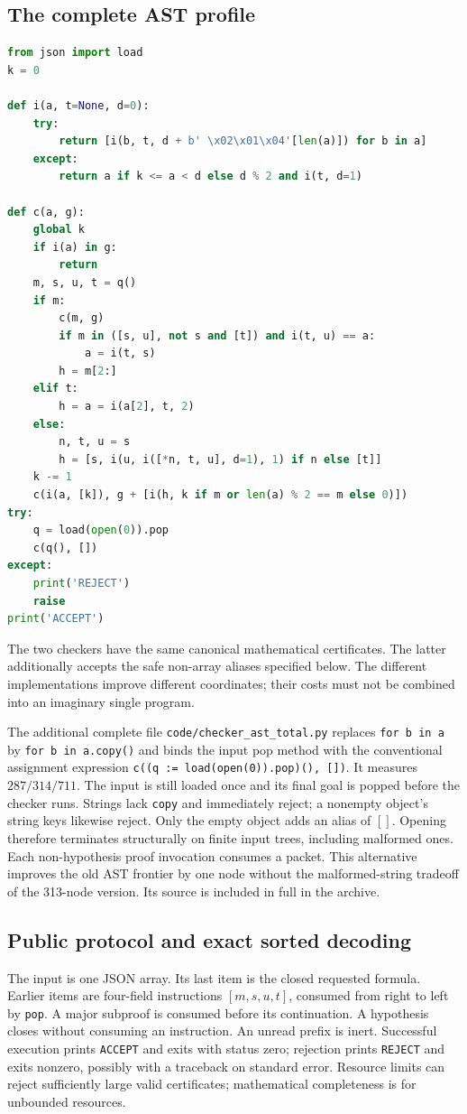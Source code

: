 \documentclass[11pt,letterpaper]{article}
\theoremstyle{definition}\newtheorem{definition}[theorem]{Definition}
\theoremstyle{remark}\newtheorem{remark}[theorem]{Remark}
\newcommand{\file}[1]{{\small\nolinkurl{#1}}}
\begin{document}
\subsection{The complete AST profile}
\begin{lstlisting}[language=Python]
from json import load
k = 0

def i(a, t=None, d=0):
    try:
        return [i(b, t, d + b' \x02\x01\x04'[len(a)]) for b in a]
    except:
        return a if k <= a < d else d % 2 and i(t, d=1)

def c(a, g):
    global k
    if i(a) in g:
        return
    m, s, u, t = q()
    if m:
        c(m, g)
        if m in ([s, u], not s and [t]) and i(t, u) == a:
            a = i(t, s)
        h = m[2:]
    elif t:
        h = a = i(a[2], t, 2)
    else:
        n, t, u = s
        h = [s, i(u, i([*n, t, u], d=1), 1) if n else [t]]
    k -= 1
    c(i(a, [k]), g + [i(h, k if m or len(a) % 2 == m else 0)])
try:
    q = load(open(0)).pop
    c(q(), [])
except:
    print('REJECT')
    raise
print('ACCEPT')
\end{lstlisting}
The two checkers have the same canonical mathematical certificates.
The latter additionally accepts the safe non-array aliases specified
below. The different implementations improve different coordinates;
their costs must not be combined into an imaginary single program.

The additional complete file \file{code/checker_ast_total.py} replaces
\texttt{for b in a} by \texttt{for b in a.copy()} and binds the input
pop method with the conventional assignment expression
\texttt{c((q := load(open(0)).pop)(), [])}. It measures $287/314/711$.
The input is still loaded once and its final goal is popped before the
checker runs. Strings lack \texttt{copy} and immediately reject; a
nonempty object's string keys likewise reject. Only the empty object
adds an alias of $[]$. Opening therefore terminates structurally on
finite input trees, including malformed ones. Each non-hypothesis proof
invocation consumes a packet. This alternative improves the old AST
frontier by one node without the malformed-string tradeoff of the
313-node version. Its source is included in full in the archive.

\subsection{Public protocol and exact sorted decoding}

The input is one JSON array. Its last item is the closed requested
formula. Earlier items are four-field instructions $[m,s,u,t]$, consumed
from right to left by \texttt{pop}. A major subproof is consumed before
its continuation. A hypothesis closes without consuming an instruction.
An unread prefix is inert. Successful execution prints
\texttt{ACCEPT} and exits with status zero; rejection prints
\texttt{REJECT} and exits nonzero, possibly with a traceback on standard
error. Resource limits can reject sufficiently large valid certificates;
mathematical completeness is for unbounded resources.
\end{document}
